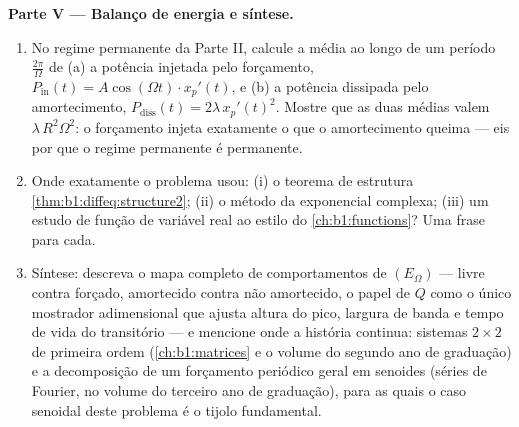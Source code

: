 \begin{problem}
\medskip
\noindent\textbf{Parte V --- Balanço de energia e síntese.}
\begin{enumerate}
  \item No regime permanente da Parte II, calcule a média ao longo
        de um período $\frac{2\pi}\Omega$ de (a) a potência injetada
        pelo forçamento, $P_{\mathrm{in}}(t) = A\cos(\Omega t)
        \cdot x_p'(t)$, e (b) a potência dissipada pelo
        amortecimento, $P_{\mathrm{diss}}(t) = 2\lambda\,x_p'(t)^2$.
        Mostre que as duas médias valem $\lambda\,R^2\Omega^2$: o
        forçamento injeta exatamente o que o amortecimento queima ---
        eis por que o regime permanente é permanente.
  \item Onde exatamente o problema usou: (i) o teorema de estrutura
        \cref{thm:b1:diffeq:structure2}; (ii) o método da exponencial
        complexa; (iii) um estudo de função de variável real ao
        estilo do \cref{ch:b1:functions}? Uma frase para cada.
  \item Síntese: descreva o mapa completo de comportamentos de $(E_\Omega)$
        --- livre contra forçado, amortecido contra não amortecido, o
        papel de $Q$ como o único mostrador adimensional que ajusta
        altura do pico, largura de banda e tempo de vida do transitório
        --- e mencione onde a história continua: sistemas $2 \times 2$
        de primeira ordem (\cref{ch:b1:matrices} e o volume do segundo ano de
        graduação) e a decomposição de um forçamento periódico geral em
        senoides (séries de Fourier, no volume do terceiro ano de
        graduação), para as quais o caso senoidal deste problema é o
        tijolo fundamental.
\end{enumerate}
\end{problem}
